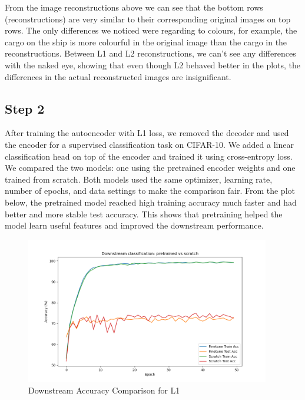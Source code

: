 From the image reconstructions above we can see that the bottom rows (reconstructions) are very similar to their corresponding original images on top rows. The only differences we noticed were regarding to colours, for example, the cargo on the ship is more colourful in the original image than the cargo in the reconstructions. Between L1 and L2 reconstructions, we can't see any differences with the naked eye, showing that even though L2 behaved better in the plots, the differences in the actual reconstructed images are insignificant.

\subsection{Step 2}

After training the autoencoder with L1 loss, we removed the decoder and used the encoder for a supervised classification task on CIFAR-10. We added a linear classification head on top of the encoder and trained it using cross-entropy loss. We compared the two models: one using the pretrained encoder weights and one trained from scratch. Both models used the same optimizer, learning rate, number of epochs, and data settings to make the comparison fair. From the plot below, the pretrained model reached high training accuracy much faster and had better and more stable test accuracy. This shows that pretraining helped the model learn useful features and improved the downstream performance.

\begin{figure}[H] 
    \centering
    \includegraphics[width=0.95\textwidth]{images/ex1_downstream_accuracy_comparison} 
    \caption{Downstream Accuracy Comparison for L1}
\end{figure}





